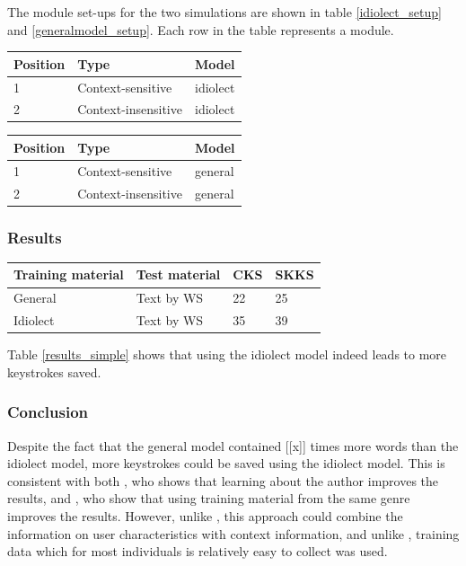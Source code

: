 \documentclass[12pt]{article}
\let\originaltable\table
\let\endoriginaltable\endtable
\renewenvironment{table}[1][ht]{%
  \originaltable[#1]
  \centering}%
  {\endoriginaltable}
\begin{document}
The module set-ups for the two simulations are shown in table \ref{idiolect_setup} and \ref{generalmodel_setup}. Each row in the table represents a module.

\begin{table}[H]
\begin{tabular}{lll} 
Position&Type&Model\\
\hline
1&Context-sensitive&idiolect\\
2&Context-insensitive&idiolect\\
\end{tabular} 
\caption{Module order for a simple idiolect simulation.} \label{idiolect_setup}  
\end{table}

\begin{table}[H]
\begin{tabular}{lll} 
Position&Type&Model\\
\hline
1&Context-sensitive&general\\
2&Context-insensitive&general\\
\end{tabular} 
\caption{Module order for a simulation for the general model.} \label{generalmodel_setup} 
\end{table}


\subsubsection{Results}

\begin{table}[H]
\begin{tabular}{ll|ll} 
Training material&Test material&CKS&SKKS\\
\hline
General &Text by WS&22&25\\
Idiolect&Text by WS&35&39\\
\end{tabular} 
\caption{Percentage of keystrokes that can be saved when using the general and the idiolect model} \label{results_simple}
\end{table}

Table \ref{results_simple} shows that  using the idiolect model indeed leads to more keystrokes saved. 

\subsubsection{Conclusion}
Despite the fact that the general model contained [[x]] times more words than the idiolect model, more keystrokes could be saved using the idiolect model. This is consistent with both , who shows that learning about the author improves the results, and , who show that using training material from the same genre improves the results. However, unlike , this approach could combine the information on user characteristics with context information, and unlike , training data which for most individuals is relatively easy to collect was used.
\end{document}
